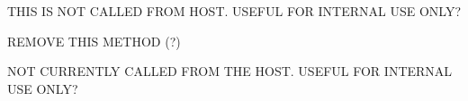 \begin{DoxyRefList}
\item[\label{a00383__todo000036}%
\hypertarget{a00383__todo000036}{}%
Member \hyperlink{a00061_a333b83bc6f37b0103ce0de65be02fede}{A\+A\+X\+\_\+\+I\+A\+C\+F\+Effect\+Parameters\+:\+:Set\+Parameter\+Default\+Normalized\+Value} (A\+A\+X\+\_\+\+C\+Param\+I\+D i\+Parameter\+I\+D, double i\+Value)=0]T\+H\+I\+S I\+S N\+O\+T C\+A\+L\+L\+E\+D F\+R\+O\+M H\+O\+S\+T. U\+S\+E\+F\+U\+L F\+O\+R I\+N\+T\+E\+R\+N\+A\+L U\+S\+E O\+N\+L\+Y? 
\item[\label{a00383__todo000039}%
\hypertarget{a00383__todo000039}{}%
Member \hyperlink{a00061_a6e28a427a0d7d0c8df69dd5eb88cff6c}{A\+A\+X\+\_\+\+I\+A\+C\+F\+Effect\+Parameters\+:\+:Set\+Parameter\+Normalized\+Relative} (A\+A\+X\+\_\+\+C\+Param\+I\+D i\+Parameter\+I\+D, double i\+Value)=0]R\+E\+M\+O\+V\+E T\+H\+I\+S M\+E\+T\+H\+O\+D (?)

N\+O\+T C\+U\+R\+R\+E\+N\+T\+L\+Y C\+A\+L\+L\+E\+D F\+R\+O\+M T\+H\+E H\+O\+S\+T. U\+S\+E\+F\+U\+L F\+O\+R I\+N\+T\+E\+R\+N\+A\+L U\+S\+E O\+N\+L\+Y?


\end{DoxyRefList}
